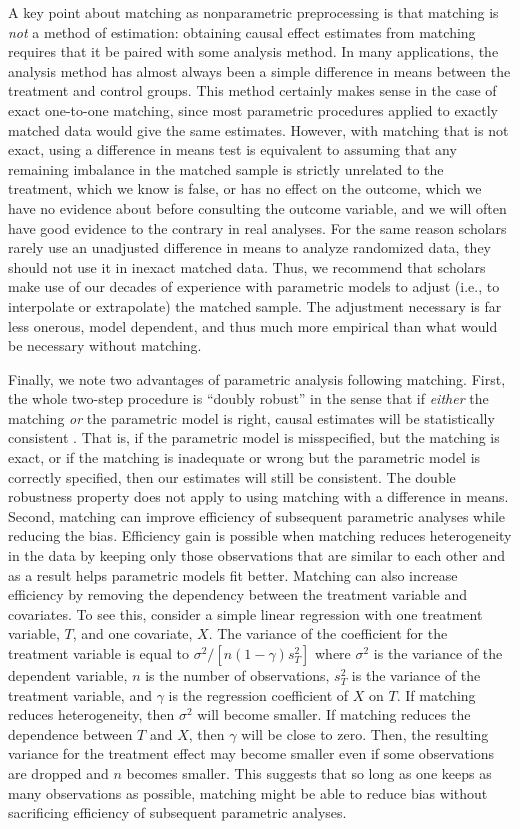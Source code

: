 \documentclass[11pt,titlepage]{article}
\begin{document}
A key point about matching as nonparametric preprocessing is that
matching is \emph{not} a method of estimation: obtaining causal effect
estimates from matching requires that it be paired with some analysis
method.  In many applications, the analysis method has almost always
been a simple difference in means between the treatment and control
groups.  This method certainly makes sense in the case of exact
one-to-one matching, since most parametric procedures applied to
exactly matched data would give the same estimates.  However, with
matching that is not exact, using a difference in means test is
equivalent to assuming that any remaining imbalance in the matched
sample is strictly unrelated to the treatment, which we know is false,
or has no effect on the outcome, which we have no evidence about
before consulting the outcome variable, and we will often have good
evidence to the contrary in real analyses.  For the same reason
scholars rarely use an unadjusted difference in means to analyze
randomized data, they should not use it in inexact matched data.
Thus, we recommend that scholars make use of our decades of experience
with parametric models to adjust (i.e., to interpolate or extrapolate)
the matched sample.  The adjustment necessary is far less onerous,
model dependent, and thus much more empirical than what would be
necessary without matching.

Finally, we note two advantages of parametric analysis following
matching. First, the whole two-step procedure is ``doubly robust'' in
the sense that if \emph{either} the matching \emph{or} the parametric
model is right, causal estimates will be statistically consistent
\citep[see][]{RobRot01}.  That is, if the parametric model is
misspecified, but the matching is exact, or if the matching is
inadequate or wrong but the parametric model is correctly specified,
then our estimates will still be consistent.  The double robustness
property does not apply to using matching with a difference in means.
Second, matching can improve efficiency of subsequent parametric
analyses while reducing the bias. Efficiency gain is possible when
matching reduces heterogeneity in the data by keeping only those
observations that are similar to each other and as a result helps
parametric models fit better. Matching can also increase efficiency by
removing the dependency between the treatment variable and covariates.
To see this, consider a simple linear regression with one treatment
variable, $T$, and one covariate, $X$. The variance of the coefficient
for the treatment variable is equal to $\sigma^2/[n (1-\gamma) s^2_T]$
where $\sigma^2$ is the variance of the dependent variable, $n$ is the
number of observations, $s^2_T$ is the variance of the treatment
variable, and $\gamma$ is the regression coefficient of $X$ on $T$. If
matching reduces heterogeneity, then $\sigma^2$ will become smaller.
If matching reduces the dependence between $T$ and $X$, then $\gamma$
will be close to zero. Then, the resulting variance for the treatment
effect may become smaller even if some observations are dropped and
$n$ becomes smaller. This suggests that so long as one keeps as many
observations as possible, matching might be able to reduce bias
without sacrificing efficiency of subsequent parametric analyses.
\end{document}
